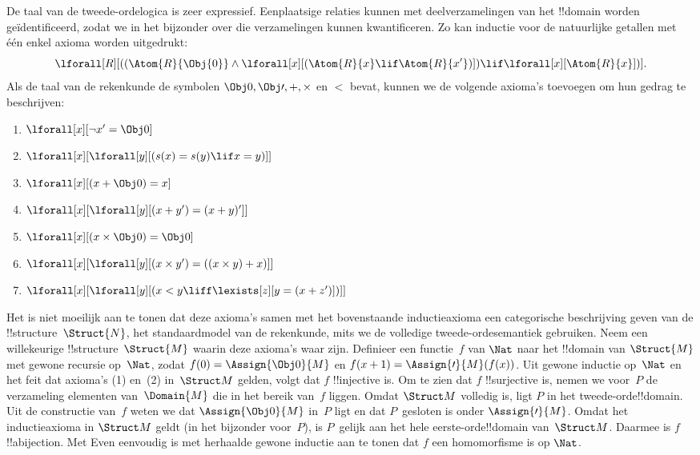 \documentclass[../../../include/open-logic-section]{subfiles}
\begin{document}
De taal van de tweede-ordelogica is zeer expressief. Eenplaatsige relaties
kunnen met deelverzamelingen van het !!{domain} worden geïdentificeerd, zodat
we in het bijzonder over die verzamelingen kunnen kwantificeren. Zo kan
inductie voor de natuurlijke getallen met één enkel axioma worden uitgedrukt:
\[
\lforall[R][((\Atom{R}{\Obj{0}} \land \lforall[x][(\Atom{R}{x} \lif
    \Atom{R}{x'})]) \lif \lforall[x][\Atom{R}{x}])].
\]
Als de taal van de rekenkunde de symbolen $\Obj 0, \Obj \prime, +,
\times$ en $<$ bevat, kunnen we de volgende axioma's toevoegen om hun gedrag
te beschrijven:
\begin{enumerate}
\item $\lforall[x][\lnot x' = \Obj 0]$
\item $\lforall[x][\lforall[y][(s(x) = s(y) \lif x = y)]]$
\item $\lforall[x][(x + \Obj 0) = x]$
\item $\lforall[x][\lforall[y][(x + y') = (x + y)']]$
\item $\lforall[x][(x \times \Obj 0) = \Obj 0]$
\item $\lforall[x][\lforall[y][(x \times y') = ((x \times y) + x)]]$
\item $\lforall[x][\lforall[y][(x < y \liff \lexists[z][y = (x + z')])]]$
\end{enumerate}
Het is niet moeilijk aan te tonen dat deze axioma's samen met het bovenstaande
inductieaxioma een categorische beschrijving geven van de
!!{structure}~$\Struct{N}$, het standaardmodel van de rekenkunde, mits we de
volledige tweede-ordesemantiek gebruiken. Neem een willekeurige
!!{structure}~$\Struct{M}$ waarin deze axioma's waar zijn. Definieer een
functie~$f$ van $\Nat$ naar het !!{domain} van $\Struct{M}$ met gewone
recursie op~$\Nat$, zodat $f(0) = \Assign{\Obj 0}{M}$ en
$f(x+1) = \Assign{\prime}{M}(f(x))$. Uit gewone inductie op~$\Nat$ en het
feit dat axioma's (1) en~(2) in~$\Struct M$ gelden, volgt dat $f$
!!{injective} is. Om te zien dat $f$ !!{surjective} is, nemen we voor~$P$ de
verzameling elementen van~$\Domain{M}$ die in het bereik van~$f$ liggen.
Omdat $\Struct M$ volledig is, ligt $P$ in het tweede-orde!!{domain}. Uit de
constructie van~$f$ weten we dat $\Assign{\Obj 0}{M}$ in~$P$ ligt en dat
$P$~gesloten is onder $\Assign{\prime}{M}$. Omdat het inductieaxioma in
$\Struct M$ geldt (in het bijzonder voor~$P$), is $P$~gelijk aan het hele
eerste-orde!!{domain} van~$\Struct M$. Daarmee is $f$ !!a{bijection}. Met
Even eenvoudig is met herhaalde gewone inductie aan te tonen dat $f$ een
homomorfisme is op $\Nat$.
\end{document}
